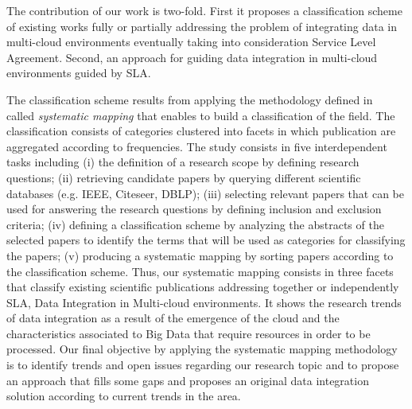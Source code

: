 The contribution of our work is two-fold. First it proposes a classification scheme of existing works fully or partially addressing the problem of integrating data in multi-cloud environments eventually taking into consideration Service Level Agreement. Second, an approach for guiding data integration in multi-cloud environments guided by SLA. 

The classification scheme results from  applying the  methodology defined in~\cite{SM:Petersen:2008} called  \textit{systematic mapping}  that enables to build a classification of the field. The classification consists of categories clustered into facets in which publication are aggregated according to frequencies. The study consists in  five interdependent tasks including (i) the definition of a research scope by defining research questions; (ii) retrieving candidate papers by querying different scientific databases (e.g. IEEE, Citeseer, DBLP); (iii) selecting relevant papers that can be used for answering the research questions by defining inclusion and exclusion criteria; (iv) defining a classification scheme by analyzing the abstracts of the selected papers to identify the terms that will be used as categories for classifying the papers; (v) producing a systematic mapping by sorting papers according to the classification scheme. Thus, our systematic mapping consists in three facets that classify existing scientific publications addressing  together or independently SLA, Data Integration in Multi-cloud environments. It shows the research trends of data integration as a result of the emergence of the cloud and the characteristics associated to Big Data that require resources in order to be processed. Our final objective by applying the systematic mapping methodology is to identify trends and open issues regarding our research topic and to propose an approach that fills some gaps and proposes an original data integration solution according to current trends in the area. 




